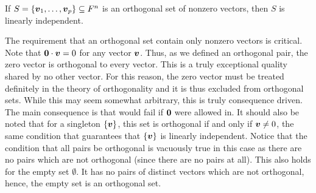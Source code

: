 \begin{Thm}\label{thm:orthoindependent} If $S = \{\boldsymbol v_1, \ldots, \boldsymbol v_p\} \subseteq F^n$ is an orthogonal set of nonzero vectors, then $S$ is linearly independent.
\end{Thm}\vs

The requirement that an orthogonal set contain only nonzero vectors is critical. Note that $\boldsymbol 0 \cdot \boldsymbol v=0$ for any vector $\boldsymbol v$. Thus, as we defined an orthogonal pair, the zero vector is orthogonal to every vector. This is a truly exceptional quality shared by no other vector. For this reason, the zero vector must be treated definitely in the theory of orthogonality and it is thus excluded from orthogonal sets. While this may seem somewhat arbitrary, this is truly consequence driven. The main consequence is that  would fail if $\boldsymbol 0$ were allowed in. It should also be noted that for a singleton $\{\boldsymbol v\}$, this set is orthogonal if and only if $\boldsymbol v\neq 0$, the same condition that guarantees that $\{\boldsymbol v\}$ is linearly independent. Notice that the condition that all pairs be orthogonal is vacuously true in this case as there are no pairs which are not orthogonal (since there are no pairs at all). This also holds for the empty set $\emptyset$. It has no pairs of distinct vectors which are not orthogonal, hence, the empty set is an orthogonal set.\\

